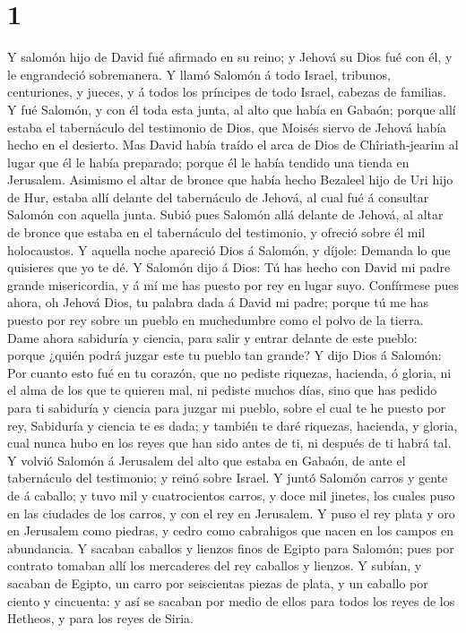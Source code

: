 \hypertarget{section}{%
\section{1}\label{section}}

 Y salomón hijo de David fué afirmado en su reino; y Jehová
su Dios fué con él, y le engrandeció sobremanera.  Y llamó
Salomón á todo Israel, tribunos, centuriones, y jueces, y á todos los
príncipes de todo Israel, cabezas de familias.  Y fué
Salomón, y con él toda esta junta, al alto que había en Gabaón; porque
allí estaba el tabernáculo del testimonio de Dios, que Moisés siervo de
Jehová había hecho en el desierto.  Mas David había traído
el arca de Dios de Chîriath-jearim al lugar que él le había preparado;
porque él le había tendido una tienda en Jerusalem. 
Asimismo el altar de bronce que había hecho Bezaleel hijo de Uri hijo de
Hur, estaba allí delante del tabernáculo de Jehová, al cual fué á
consultar Salomón con aquella junta.  Subió pues Salomón
allá delante de Jehová, al altar de bronce que estaba en el tabernáculo
del testimonio, y ofreció sobre él mil holocaustos.  Y
aquella noche apareció Dios á Salomón, y díjole: Demanda lo que
quisieres que yo te dé.  Y Salomón dijo á Dios: Tú has hecho
con David mi padre grande misericordia, y á mí me has puesto por rey en
lugar suyo.  Confírmese pues ahora, oh Jehová Dios, tu
palabra dada á David mi padre; porque tú me has puesto por rey sobre un
pueblo en muchedumbre como el polvo de la tierra.  Dame
ahora sabiduría y ciencia, para salir y entrar delante de este pueblo:
porque ¿quién podrá juzgar este tu pueblo tan grande?  Y
dijo Dios á Salomón: Por cuanto esto fué en tu corazón, que no pediste
riquezas, hacienda, ó gloria, ni el alma de los que te quieren mal, ni
pediste muchos días, sino que has pedido para ti sabiduría y ciencia
para juzgar mi pueblo, sobre el cual te he puesto por rey, 
Sabiduría y ciencia te es dada; y también te daré riquezas, hacienda, y
gloria, cual nunca hubo en los reyes que han sido antes de ti, ni
después de ti habrá tal.  Y volvió Salomón á Jerusalem del
alto que estaba en Gabaón, de ante el tabernáculo del testimonio; y
reinó sobre Israel.  Y juntó Salomón carros y gente de á
caballo; y tuvo mil y cuatrocientos carros, y doce mil jinetes, los
cuales puso en las ciudades de los carros, y con el rey en Jerusalem.
 Y puso el rey plata y oro en Jerusalem como piedras, y
cedro como cabrahigos que nacen en los campos en abundancia.
 Y sacaban caballos y lienzos finos de Egipto para Salomón;
pues por contrato tomaban allí los mercaderes del rey caballos y
lienzos.  Y subían, y sacaban de Egipto, un carro por
seiscientas piezas de plata, y un caballo por ciento y cincuenta: y así
se sacaban por medio de ellos para todos los reyes de los Hetheos, y
para los reyes de Siria.

